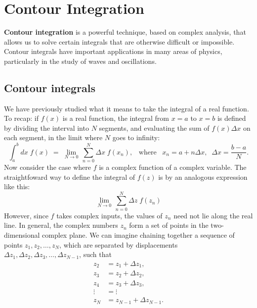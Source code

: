 \documentclass[10pt,a4paper]{article}
\begin{document}
\setcounter{page}{59}
\section{Contour Integration}\label{contour-integration}

\textbf{Contour integration} is a powerful technique, based on complex
analysis, that allows us to solve certain integrals that are otherwise
difficult or impossible. Contour integrals have important applications
in many areas of physics, particularly in the study of waves and
oscillations.

\hypertarget{contour-integrals}{%
\subsection{Contour integrals}\label{contour-integrals}}

We have previously studied what it means to take the integral of a
real function. To recap: if $f(x)$ is a real function, the integral
from $x=a$ to $x=b$ is defined by dividing the interval into $N$
segments, and evaluating the sum of $f(x)\Delta x$ on each segment, in
the limit where $N$ goes to infinity:
\begin{equation}
\int_a^b dx\; f(x) \;=\; \lim_{N \rightarrow 0} \, \sum_{n=0}^{N} \Delta x\; f(x_n), \;\;\;\mathrm{where}\;\;\;x_n = a + n\Delta x, \;\;\Delta x = \frac{b-a}{N}.
\end{equation}
Now consider the case where $f$ is a complex function of a complex
variable. The straightfoward way to define the integral of $f(z)$ is
by an analogous expression like this:
\begin{equation}
\lim_{N \rightarrow 0} \, \sum_{n=0}^{N} \Delta z\; f(z_n)
\end{equation}
However, since $f$ takes complex inputs, the values of $z_n$ need not
lie along the real line. In general, the complex numbers $z_n$ form a
set of points in the two-dimensional complex plane. We can imagine
chaining together a sequence of points $z_1, z_2, \dots, z_N$, which
are separated by displacements $\Delta z_1, \Delta z_2, \Delta z_3,
\dots, \Delta z_{N-1}$, such that
\begin{equation}
\begin{aligned}z_2 &= z_1 + \Delta z_1, \\ z_3 &= z_2 + \Delta z_2, \\ z_4 &= z_3 + \Delta z_3, \\ \vdots &= \vdots\\ z_N &= z_{N-1} + \Delta z_{N-1}.\end{aligned}
\end{equation}
\end{document}
